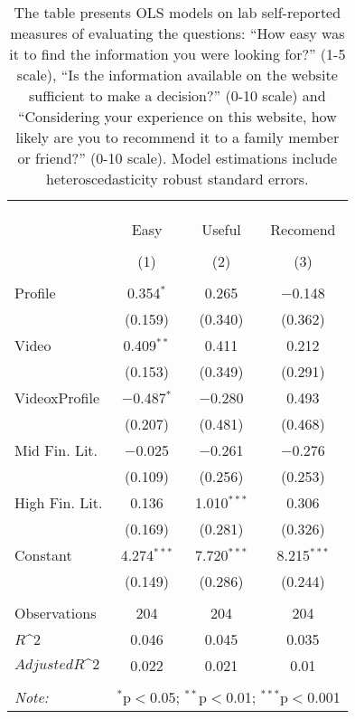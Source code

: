
\begin{table}[H] \centering 
  \caption{The table presents OLS models on lab self-reported measures of evaluating the questions: 
            ``How easy was it to find the information you were looking for?'' (1-5 scale), 
            ``Is the information available on the website sufficient to make a decision?'' (0-10 scale) and
            ``Considering your experience on this website, how likely are you to recommend it to a family member or friend?'' (0-10 scale).
            Model estimations include heteroscedasticity robust standard errors.
          } 
  \label{tbl:self_reported_lab} 
\begin{tabular}{@{\extracolsep{5pt}}lccc} 
\\[-1.8ex]\hline 
\hline \\[-1.8ex] 
\\[-1.8ex] & \multicolumn{3}{c}{ } \\ 
 & Easy & Useful & Recomend \\ 
\\[-1.8ex] & (1) & (2) & (3)\\ 
\hline \\[-1.8ex] 
 Profile & 0.354$^{*}$ & 0.265 & $-$0.148 \\ 
  & (0.159) & (0.340) & (0.362) \\ 
  Video & 0.409$^{**}$ & 0.411 & 0.212 \\ 
  & (0.153) & (0.349) & (0.291) \\ 
  VideoxProfile & $-$0.487$^{*}$ & $-$0.280 & 0.493 \\ 
  & (0.207) & (0.481) & (0.468) \\ 
  Mid Fin. Lit. & $-$0.025 & $-$0.261 & $-$0.276 \\ 
  & (0.109) & (0.256) & (0.253) \\ 
  High Fin. Lit. & 0.136 & 1.010$^{***}$ & 0.306 \\ 
  & (0.169) & (0.281) & (0.326) \\ 
  Constant & 4.274$^{***}$ & 7.720$^{***}$ & 8.215$^{***}$ \\ 
  & (0.149) & (0.286) & (0.244) \\ 
 \hline \\[-1.8ex] 
Observations & 204 & 204 & 204 \\ 
$R\^2$ & 0.046 & 0.045 & 0.035 \\ 
$Adjusted R\^2$ & 0.022 & 0.021 & 0.01 \\ 
\hline 
\hline \\[-1.8ex] 
\textit{Note:}  & \multicolumn{3}{l}{$^{*}$p$<$0.05; $^{**}$p$<$0.01; $^{***}$p$<$0.001} \\ 
\end{tabular} 
\end{table} 
